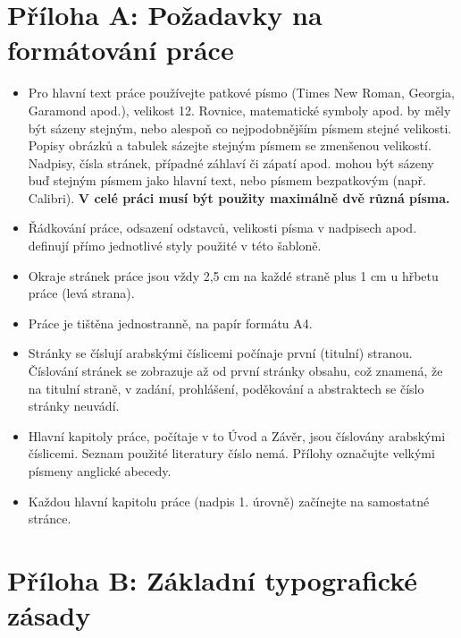 \section*{Příloha A: Požadavky na formátování práce}
    \label{app:pozadavky}

    \begin{itemize}
        \item Pro hlavní text práce používejte patkové písmo (Times New Roman, Georgia, Garamond apod.), velikost 12. Rovnice, matematické symboly apod. by měly být sázeny stejným, nebo alespoň co nejpodobnějším písmem stejné velikosti. Popisy obrázků a tabulek sázejte stejným písmem se zmenšenou velikostí. Nadpisy, čísla stránek, případné záhlaví či zápatí apod. mohou být sázeny buď stejným písmem jako hlavní text, nebo písmem bezpatkovým (např. Calibri). \textbf{V celé práci musí být použity maximálně dvě různá písma.}
        \item Řádkování práce, odsazení odstavců, velikosti písma v nadpisech apod. definují přímo jednotlivé styly použité v této šabloně.
        \item Okraje stránek práce jsou vždy 2,5 cm na každé straně plus 1 cm u hřbetu práce (levá strana).
        \item Práce je tištěna jednostranně, na papír formátu A4.
        \item Stránky se číslují arabskými číslicemi počínaje první (titulní) stranou. Číslování stránek se zobrazuje až od první stránky obsahu, což znamená, že na titulní straně, v zadání, prohlášení, poděkování a abstraktech se číslo stránky neuvádí.
        \item Hlavní kapitoly práce, počítaje v to Úvod a Závěr, jsou číslovány arabskými číslicemi. Seznam použité literatury číslo nemá. Přílohy označujte velkými písmeny anglické abecedy.
        \item Každou hlavní kapitolu práce (nadpis 1. úrovně) začínejte na samostatné stránce.
    \end{itemize}
\clearpage

\section*{Příloha B: Základní typografické zásady}
    \label{app:typo}
    
